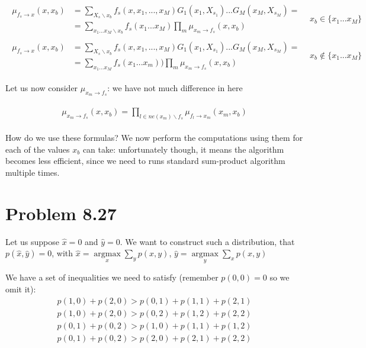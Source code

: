\documentclass[fleqn]{article}
\DeclareMathOperator*{\argmax}{argmax} %
\begin{document}
\begin{align}
	\begin{split}
		\mu_{f_s \to x}(x, x_b) &= \sum\limits_{X_s \backslash x_b} f_s(x,x_1,...,x_M)G_1 (x_1,X_{s_1})...G_M (x_M,X_{s_M}) = \\
		&= \sum\limits_{x_1...x_M \backslash x_b}f_s(x_1...x_M)\prod\limits_{m}\mu_{x_m \to f_s}(x, x_b)
	\end{split}
& x_b \in \{x_1...x_M\}\\
\begin{split}
	\mu_{f_s \to x}(x, x_b) &= \sum\limits_{X_s \backslash x_b} f_s(x,x_1,...,x_M)G_1 (x_1,X_{s_1})...G_M (x_M,X_{s_M}) = \\
	&= \sum\limits_{x_1...x_M}f_s(x_1...x_m))\prod\limits_{m}\mu_{x_m \to f_s}(x, x_b)
\end{split}
& x_b \notin  \{x_1...x_M\}
\end{align}
 
Let us now consider $\mu_{x_m \to f_s}$: we have not much difference in here

\begin{align}
	\begin{split}
		\mu_{x_m \to f_s}(x, x_b) = \prod\limits_{l \in ne(x_m) \backslash f_s}\mu_{f_l \to x_m}(x_m, x_b)
	\end{split}
\end{align}

How do we use these formulas? We now perform the computations using them for each of the values $x_b$ can take: unfortunately though, it means the algorithm becomes less efficient, since we need to runs standard sum-product algorithm multiple times.


\section*{Problem 8.27}

Let us suppose $\hat x =0$ and $\hat y = 0$. We want to construct such a distribution, that $p(\hat x, \hat y) = 0$, with $\hat x = \argmax\limits_x \sum\limits_y p(x, y)$, $\hat y = \argmax\limits_y\sum\limits_x p(x, y)$

We have a set of inequalities we need to satisfy (remember $p(0,0) = 0$ so we omit it):
\begin{align}
	p(1, 0) + p(2, 0) > p(0,1) + p(1,1) + p(2,1)\\
	p(1, 0) + p(2, 0) > p(0,2) + p(1,2) + p(2,2)\\
	p(0,1) + p(0,2) > p(1,0) + p(1,1) + p(1,2)\\
	p(0,1) + p(0,2) > p(2,0) + p(2,1) + p(2,2)
\end{align}
\end{document}

